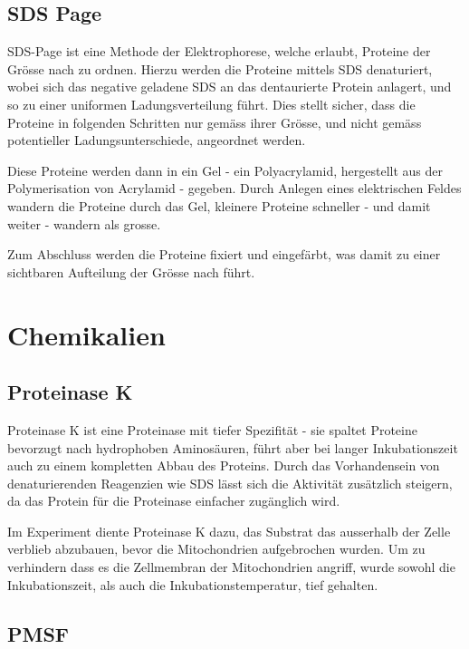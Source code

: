 \documentclass[a4paper,german]{scrreprt}
\begin{document}
\section{SDS Page}

SDS-Page ist eine Methode der Elektrophorese, welche erlaubt, Proteine der
Grösse nach zu ordnen. Hierzu werden die Proteine mittels SDS denaturiert,
wobei sich das negative geladene SDS an das dentaurierte Protein anlagert, und
so zu einer uniformen Ladungsverteilung führt. Dies stellt sicher, dass die
Proteine in folgenden Schritten nur gemäss ihrer Grösse, und nicht gemäss
potentieller Ladungsunterschiede, angeordnet werden.

Diese Proteine werden dann in ein Gel - ein Polyacrylamid, hergestellt aus der
Polymerisation von Acrylamid - gegeben. Durch Anlegen eines elektrischen Feldes
wandern die Proteine durch das Gel, kleinere Proteine schneller - und damit
weiter - wandern als grosse.

Zum Abschluss werden die Proteine fixiert und eingefärbt, was damit zu einer
sichtbaren Aufteilung der Grösse nach führt.

\chapter{Chemikalien}

\section{Proteinase K}

Proteinase K ist eine Proteinase mit tiefer Spezifität - sie spaltet Proteine
bevorzugt nach hydrophoben Aminosäuren, führt aber bei langer Inkubationszeit
auch zu einem kompletten Abbau des Proteins. Durch das Vorhandensein von
denaturierenden Reagenzien wie SDS lässt sich die Aktivität zusätzlich
steigern, da das Protein für die Proteinase einfacher zugänglich wird. \cite{stimulation_proteinase}

Im Experiment diente Proteinase K dazu, das Substrat das ausserhalb der Zelle
verblieb abzubauen, bevor die Mitochondrien aufgebrochen wurden. Um zu
verhindern dass es die Zellmembran der Mitochondrien angriff, wurde sowohl die
Inkubationszeit, als auch die Inkubationstemperatur, tief gehalten.

\section{PMSF}
\end{document}
